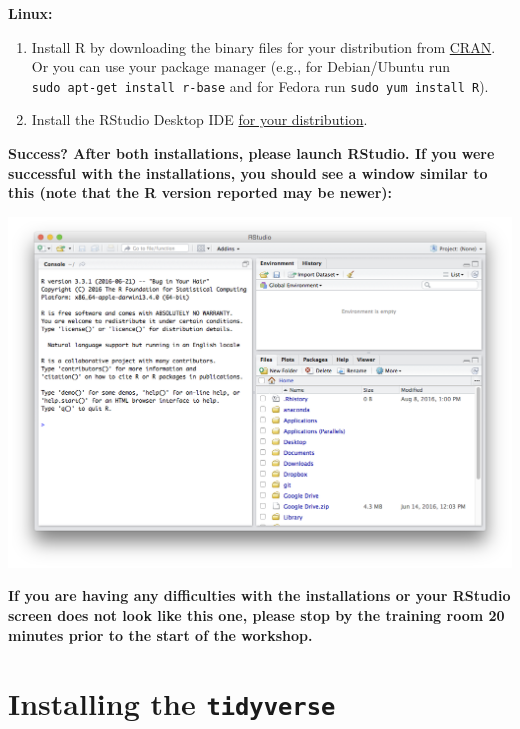 \documentclass[
]{book}
\providecommand{\tightlist}{%
  \setlength{\itemsep}{0pt}\setlength{\parskip}{0pt}}
\begin{document}
\textbf{Linux:}

\begin{enumerate}
\def\labelenumi{\arabic{enumi}.}
\tightlist
\item
  Install R by downloading the binary files for your distribution from \href{http://cran.r-project.org/index.html}{CRAN}. Or you can use your package manager (e.g., for Debian/Ubuntu run \texttt{sudo\ apt-get\ install\ r-base} and for Fedora run \texttt{sudo\ yum\ install\ R}).
\item
  Install the RStudio Desktop IDE \href{https://rstudio.com/products/rstudio/download/\#download}{for your distribution}.
\end{enumerate}

\begin{alert}

\textbf{Success? After both installations, please launch RStudio. If you were successful with the installations, you should see a window similar to this (note that the R version reported may be newer):}

\end{alert}

\includegraphics{R/Rinstall/images/rstudio_successful_install.png}

\begin{alert}

\textbf{If you are having any difficulties with the installations or your RStudio screen does not look like this one, please stop by the training room 20 minutes prior to the start of the workshop.}

\end{alert}

\hypertarget{installing-the-tidyverse}{%
\section{\texorpdfstring{Installing the \texttt{tidyverse}}{Installing the tidyverse}}\label{installing-the-tidyverse}}
\end{document}
